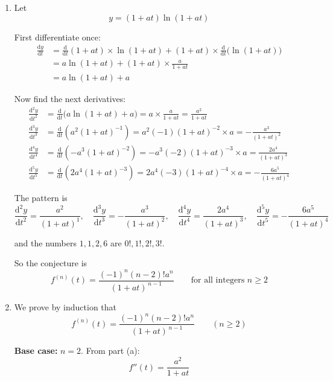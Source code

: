 \documentclass[leqno]{article}
\begin{document}
\begin{enumerate}[
  label=\textbf{\arabic*.},
  leftmargin=*,
  topsep=0pt,
  partopsep=0pt,
  parsep=0pt
]
\vspace*{10pt}

\begin{djsSolution}
\begin{enumerate}[label=\textbf{(\alph*)}]
  \item Let
  \[
  y=(1+at)\ln(1+at)
  \]

  First differentiate once:
  \begin{align*}
  \frac{\mathrm{d}y}{\mathrm{d}t}
  &= \frac{\mathrm{d}}{\mathrm{d}t}(1+at)\times \ln(1+at) + (1+at)\times \frac{\mathrm{d}}{\mathrm{d}t}\bigl(\ln(1+at)\bigr) \\
  &= a\ln(1+at) + (1+at)\times \frac{a}{1+at} \\
  &= a\ln(1+at)+a
  \end{align*}

  Now find the next derivatives:
  \begin{align*}
  \frac{\mathrm{d}^2y}{\mathrm{d}t^2}
  &= \frac{\mathrm{d}}{\mathrm{d}t}\bigl(a\ln(1+at)+a\bigr)
  = a\times \frac{a}{1+at}
  = \frac{a^2}{1+at}
  \\
  \frac{\mathrm{d}^3y}{\mathrm{d}t^3}
  &= \frac{\mathrm{d}}{\mathrm{d}t}\left(a^2(1+at)^{-1}\right)
  = a^2(-1)(1+at)^{-2}\times a
  = -\frac{a^3}{(1+at)^2}
  \\
  \frac{\mathrm{d}^4y}{\mathrm{d}t^4}
  &= \frac{\mathrm{d}}{\mathrm{d}t}\left(-a^3(1+at)^{-2}\right)
  = -a^3(-2)(1+at)^{-3}\times a
  = \frac{2a^4}{(1+at)^3}
  \\
  \frac{\mathrm{d}^5y}{\mathrm{d}t^5}
  &= \frac{\mathrm{d}}{\mathrm{d}t}\left(2a^4(1+at)^{-3}\right)
  = 2a^4(-3)(1+at)^{-4}\times a
  = -\frac{6a^5}{(1+at)^4}
  \end{align*}

  The pattern is
  \[
  \frac{\mathrm{d}^2y}{\mathrm{d}t^2}=\frac{a^2}{(1+at)^1},\quad
  \frac{\mathrm{d}^3y}{\mathrm{d}t^3}=-\frac{a^3}{(1+at)^2},\quad
  \frac{\mathrm{d}^4y}{\mathrm{d}t^4}=\frac{2a^4}{(1+at)^3},\quad
  \frac{\mathrm{d}^5y}{\mathrm{d}t^5}=-\frac{6a^5}{(1+at)^4}
  \]

  and the numbers \(1,1,2,6\) are \(0!,1!,2!,3!\).

  So the conjecture is
  \[
  f^{(n)}(t)=\frac{(-1)^n(n-2)!a^n}{(1+at)^{\,n-1}}
  \qquad \text{for all integers } n\ge 2
  \]

  \item We prove by induction that
  \[
  f^{(n)}(t)=\frac{(-1)^n(n-2)!a^n}{(1+at)^{\,n-1}}
  \qquad (n\ge 2)
  \]

  \textbf{Base case:} \(n=2\). From part (a):
  \[
  f''(t)=\frac{a^2}{1+at}
  \]


\end{enumerate}
\end{djsSolution}
\end{enumerate}
\end{document}
